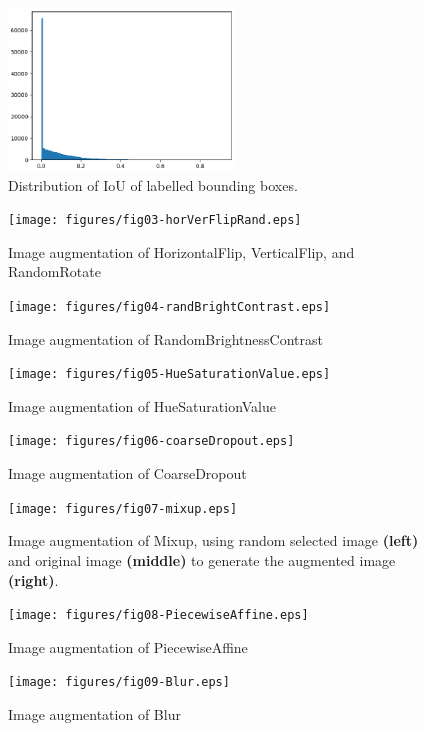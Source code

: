 \documentclass[utf8]{frontiersSCNS} %
\begin{document}
\begin{figure}[H]
\centering
\includegraphics[width=6cm]{figures/fig02-iou.eps}
\caption{Distribution of IoU of labelled bounding boxes.}\label{fig:2}
\end{figure}


\begin{figure}[H]
\centering
\texttt{[image: figures/fig03-horVerFlipRand.eps]}
\caption{Image augmentation of HorizontalFlip, VerticalFlip, and RandomRotate}\label{fig:3}
\end{figure}

\begin{figure}[H]
\centering
\texttt{[image: figures/fig04-randBrightContrast.eps]}
\caption{Image augmentation of RandomBrightnessContrast}\label{fig:4}
\end{figure}

\begin{figure}[H]
\centering
\texttt{[image: figures/fig05-HueSaturationValue.eps]}
\caption{Image augmentation of HueSaturationValue}\label{fig:5}
\end{figure}

\begin{figure}[H]
\centering
\texttt{[image: figures/fig06-coarseDropout.eps]}
\caption{Image augmentation of CoarseDropout}\label{fig:6}
\end{figure}

\begin{figure}[H]
\centering
\texttt{[image: figures/fig07-mixup.eps]}
\caption{Image augmentation of Mixup, using random selected image \textbf{(left)} and original image \textbf{(middle)} to generate the augmented image \textbf{(right)}.}\label{fig:7}
\end{figure}

\begin{figure}[H]
\centering
\texttt{[image: figures/fig08-PiecewiseAffine.eps]}
\caption{Image augmentation of PiecewiseAffine}\label{fig:8}
\end{figure}

\begin{figure}[H]
\centering
\texttt{[image: figures/fig09-Blur.eps]}
\caption{Image augmentation of Blur}\label{fig:9}
\end{figure}
\end{document}
